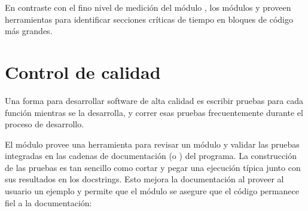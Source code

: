 \documentclass[a5paper,10pt,spanish]{sphinxmanual}
\begin{document}
\begin{sphinxVerbatim}[commandchars=\\\{\}]
   
 
 
\end{sphinxVerbatim}

\sphinxAtStartPar
En contraste con el fino nivel de medición del módulo , los módulos  y  proveen herramientas para identificar secciones críticas de tiempo en bloques de código más grandes.


\section{Control de calidad}
\label{\detokenize{tutorial/stdlib:quality-control}}\label{\detokenize{tutorial/stdlib:tut-quality-control}}
\sphinxAtStartPar
Una forma para desarrollar software de alta calidad es escribir pruebas para cada función mientras se la desarrolla, y correr esas pruebas frecuentemente durante el proceso de desarrollo.

\sphinxAtStartPar
El módulo  provee una herramienta para revisar un módulo y validar las pruebas integradas en las cadenas de documentación (o ) del programa.  La construcción de las pruebas es tan sencillo como cortar y pegar una ejecución típica junto con sus resultados en los docstrings.  Esto mejora la documentación al proveer al usuario un ejemplo y permite que el módulo  se asegure que el código permanece fiel a la documentación:

\begin{sphinxVerbatim}[commandchars=\\\{\}]
 

       

 
   
\end{sphinxVerbatim}
\end{document}
